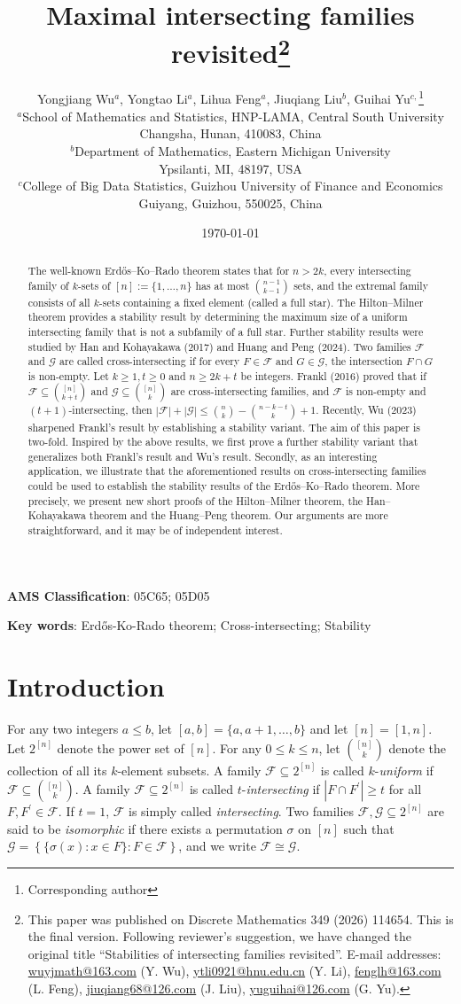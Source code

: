 \documentclass[11pt]{article}
\date{\today}
\title{\bf\Large Maximal intersecting families revisited\footnote{This paper was published on Discrete Mathematics 349 (2026) 114654. This is the final version. Following reviewer's
suggestion, we have changed the original title ``Stabilities of intersecting families revisited''.  E-mail addresses: \url{wuyjmath@163.com} (Y. Wu), \url{ytli0921@hnu.edu.cn} (Y. Li), \url{fenglh@163.com} (L. Feng), \url{jiuqiang68@126.com} (J. Liu), \url{yuguihai@126.com} (G. Yu).}}
\author{
{\small  Yongjiang Wu$^a$, Yongtao Li$^a$, Lihua Feng$^a$, Jiuqiang Liu$^b$, Guihai Yu$^{c,}$\footnote{Corresponding author}}\\[2mm]
\small $^a$School of Mathematics and Statistics, HNP-LAMA, Central South University\\
 \small Changsha, Hunan, 410083, China\\
\small $^b$Department of Mathematics, Eastern Michigan University\\
 \small  Ypsilanti, MI, 48197, USA \\ 
  \small $^c$College of Big Data Statistics, Guizhou University of Finance and Economics\\
 \small  Guiyang, Guizhou, 550025, China }
\numberwithin{equation}{section}
\begin{document}
\maketitle


\begin{abstract} 
The well-known Erd\H{o}s--Ko--Rado theorem 
states that for $n> 2k$, every intersecting family of $k$-sets of $[n]:=\{1,\ldots ,n\}$ has at most $ {n-1 \choose k-1}$ sets, and the extremal family consists of all $k$-sets containing a fixed element (called a full star). 
The Hilton--Milner theorem provides a stability result by determining the maximum size of a uniform intersecting family that is not a subfamily of a full star. 
  Further stability results were studied by Han and Kohayakawa (2017) and Huang and Peng (2024).  
Two families $\mathcal{F}$ and $\mathcal{G}$ are called cross-intersecting if for every $F\in \mathcal{F}$ and $G\in \mathcal{G}$, the intersection $F\cap G$ is non-empty.  
Let $k \geq 1, t\ge 0$ and $n \geq 2 k+t$ be integers.  Frankl (2016) proved that if $\mathcal{F} \subseteq\binom{[n]}{k+t}$ and $\mathcal{G} \subseteq\binom{[n]}{k}$ are cross-intersecting families, and $\mathcal{F}$ is non-empty and $(t+1)$-intersecting, then
$|\mathcal{F}|+|\mathcal{G}| \leq\binom{n}{k}-\binom{n-k-t}{k}+1$. Recently, Wu (2023) sharpened Frankl's result by establishing a stability variant.  
The aim of this paper is two-fold. 
Inspired by the above results, 
we first prove a further stability variant that generalizes both Frankl's result and Wu's result. 
Secondly, as an interesting application, 
we illustrate that the aforementioned results on cross-intersecting families could be used to establish the stability results of the Erd\H{o}s--Ko--Rado theorem. More precisely, we present new short proofs of the Hilton--Milner theorem, the Han--Kohayakawa theorem and the Huang--Peng theorem. 
Our arguments are more straightforward, and it may be of independent interest. 
\end{abstract}


 {\bf AMS Classification}:  05C65; 05D05 
 
 {\bf Key words}:  Erd\H{o}s-Ko-Rado theorem; Cross-intersecting; Stability

\section{Introduction}

For any two integers $a\leq b$, let  $[a, b]=\{a, a+1, \ldots, b\}$ and  let $[n]=[1,n]$. Let $2^{[n]}$ denote the power set of $[n]$. For any $0 \leq k \leq n$, let $\binom{[n]}{k}$ denote the collection of all its $k$-element subsets. A family $\mathcal{F} \subseteq 2^{[n]}$ is called $k$-\textit{uniform} if $\mathcal{F} \subseteq \binom{[n]}{k}$. A family $\mathcal{F} \subseteq 2^{[n]}$ is called $t$-\textit{intersecting} if $|F\cap F^{\prime}|\geq t$
 for all $F, F^{\prime}\in \mathcal{F}$. If $t=1$, $\mathcal{F}$ is simply called \textit{intersecting}. Two families  $\mathcal{F}, \mathcal{G}\subseteq 2^{[n]}$ are  said to be \textit{isomorphic} if there exists a permutation $\sigma$ on $[n]$ such that $\mathcal{G}=\left\{\{\sigma(x):x\in F\}: F\in \mathcal{F}\right\}$, and we write $\mathcal{F}\cong\mathcal{G}$.
\end{document}
